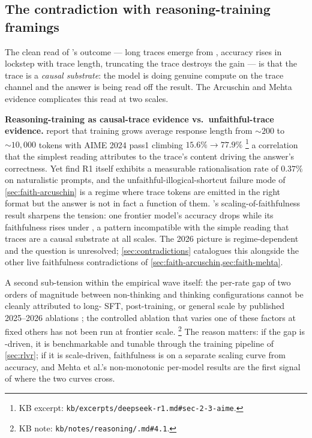 \subsection{The contradiction with reasoning-training framings}
\label{sec:faith-contradiction}

The clean read of \citet{deepseek-r1}'s  outcome — long traces
emerge from , accuracy rises in lockstep with trace length,
truncating the trace destroys the gain — is that the trace is a
\emph{causal substrate}: the model is doing genuine compute on the
trace channel and the answer is being read off the result. The
Arcuschin and Mehta evidence complicates this read at two scales.

\begin{contradiction}
\textbf{Reasoning-training as causal-trace evidence vs.\ unfaithful-trace
evidence.} \citet[\S 2.2]{deepseek-r1} report that  training grows
average response length from $\sim 200$ to $\sim 10{,}000$ tokens%
with AIME 2024 pass\@1 climbing $15.6\% \to 77.9\%$%
\footnote{KB excerpt:
\texttt{kb/excerpts/deepseek-r1.md\#sec-2-3-aime}.} a correlation
that the simplest reading attributes to the trace's content driving
the answer's correctness. Yet \citet{arcuschin2025-cot-wild} find R1
itself exhibits a measurable rationalisation rate of $0.37\%$
\citep[abstract]{arcuschin2025-cot-wild} on naturalistic prompts, and
the unfaithful-illogical-shortcut failure mode of
\cref{sec:faith-arcuschin} is a regime where trace tokens are emitted
in the right format but the answer is not in fact a function of them.
\citet{mehta2026-faithfulness-scaling}'s scaling-of-faithfulness result
sharpens the tension: one frontier model's accuracy drops while its
faithfulness rises under , a pattern incompatible with
the simple reading that traces are a causal substrate at all scales.
The 2026 picture is regime-dependent and the question is unresolved;
\cref{sec:contradictions} catalogues this alongside the other live
faithfulness contradictions of \cref{sec:faith-arcuschin,sec:faith-mehta}.
\end{contradiction}

A second sub-tension within the empirical wave itself: the per-rate
gap of two orders of magnitude between non-thinking and thinking
configurations \citep[abstract]{arcuschin2025-cot-wild} cannot be
cleanly attributed to long- SFT,  post-training, or general
scale by published 2025--2026 ablations
\citep[\S 4]{mehta2026-faithfulness-scaling}; the controlled
ablation that varies one of these factors at fixed others has not been
run at frontier scale.%
\footnote{KB note:
\texttt{kb/notes/reasoning/.md\#4.1}.} The reason
matters: if the gap is -driven, it is benchmarkable and tunable
through the training pipeline of \cref{sec:rlvr}; if it is scale-driven,
faithfulness is on a separate scaling curve from accuracy, and Mehta et
al.'s non-monotonic per-model results are the first signal of where the
two curves cross.

